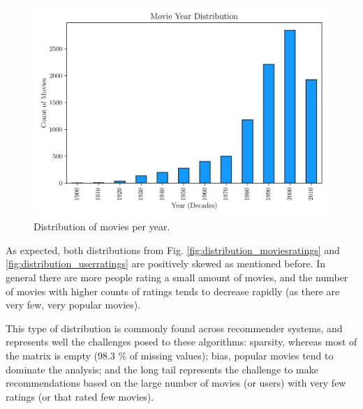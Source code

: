 \documentclass[conference]{IEEEtran}
\begin{document}
\begin{figure}[H]
    \centering
    \includegraphics[width=1\linewidth]{assets/year_distribution.png}
    \caption{Distribution of movies per year.}
    \label{fig:year_distribution}
\end{figure}

As expected, both distributions from Fig. \ref{fig:distribution_moviesratings} and \ref{fig:distribution_userratings} are positively skewed as mentioned before. In general there are more people rating a small amount of movies, and the number of movies with higher counts of ratings tends to decrease rapidly (as there are very few, very popular movies).


This type of distribution is commonly found across recommender systems, and represents well the challenges posed to these algorithms: sparsity, whereas most of the matrix is empty (98.3 \% of missing values); bias, popular movies tend to dominate the analysis; and the long tail represents the challenge to make recommendations based on the large number of movies (or users) with very few ratings (or that rated few movies).
\end{document}
